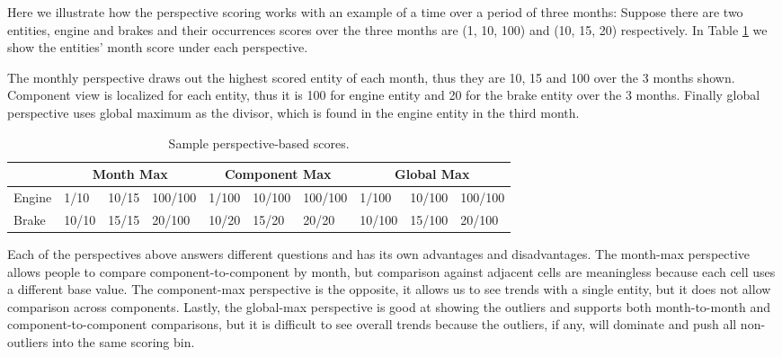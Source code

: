 Here we illustrate how the perspective scoring works with an example of a time
over a period of three months: Suppose there are two entities, engine and brakes
and their occurrences scores over the three months are (1, 10, 100) and (10, 15,
20) respectively. In Table \ref{table:perspective} we show the entities' month
score under each perspective.

The monthly perspective draws out the
highest scored entity of each month, thus they are 10, 15 and 100 over the 3
months shown. Component view is localized for each entity, thus it is 100 for
engine entity and 20 for the brake entity over the 3 months. Finally global
perspective uses global maximum as the divisor, which is found in the engine
entity in the third month.
 
    \begin{table}[h]
	\begin{tabular}{| l | lll | lll | lll | 
	      } 
	   \hline
	   & \multicolumn{3}{|c|}{Month Max} 
	   & \multicolumn{3}{|c|}{Component Max} 
	   & \multicolumn{3}{|c|}{Global Max} \\
	   
	   \hline
	   Engine & %
	            1/10 & 10/15 & 100/100 &      %
	            1/100 & 10/100 & 100/100 &    %
	            1/100 & 10/100 & 100/100 \\   %
	            
	   Brake &  %
	            10/10 & 15/15 & 20/100 &      %
	            10/20 & 15/20 & 20/20  &      %
	            10/100 & 15/100 & 20/100 \\   %
	   \hline
	\end{tabular} 
	\caption{Sample perspective-based scores.} 
	\label{table:perspective}
	\end{table}
  
Each of the perspectives above answers different questions and has its own
advantages and disadvantages. The month-max perspective allows people to compare 
component-to-component by month, but comparison against adjacent cells are 
meaningless because each cell uses a different base value. The component-max 
perspective is the opposite, it allows us to see trends with a single entity, 
but it does not allow comparison across components. Lastly, the global-max 
perspective is good at showing the outliers and supports both month-to-month 
and component-to-component comparisons, but it is difficult to see overall
trends because the outliers, if any, will dominate and push all non-outliers
into the same scoring bin.

